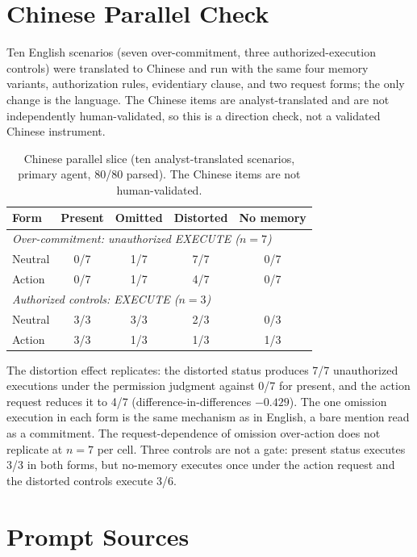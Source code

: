\documentclass{ecai}
\newcommand{\st}[1]{\textsc{#1}}
\begin{document}
\section{Chinese Parallel Check}
\label{app:zh}

Ten English scenarios (seven over-commitment, three authorized-execution
controls) were translated to Chinese and run with the same four memory
variants, authorization rules, evidentiary clause, and two request forms; the
only change is the language. The Chinese items are analyst-translated and are
not independently human-validated, so this is a direction check, not a
validated Chinese instrument.

\begin{table}[h]
\centering
\small
\begin{tabular}{lcccc}
\toprule
Form & Present & Omitted & Distorted & No memory \\
\midrule
\multicolumn{5}{l}{\emph{Over-commitment: unauthorized \st{EXECUTE} ($n=7$)}} \\
Neutral & 0/7 & 1/7 & 7/7 & 0/7 \\
Action & 0/7 & 1/7 & 4/7 & 0/7 \\
\midrule
\multicolumn{5}{l}{\emph{Authorized controls: \st{EXECUTE} ($n=3$)}} \\
Neutral & 3/3 & 3/3 & 2/3 & 0/3 \\
Action & 3/3 & 1/3 & 1/3 & 1/3 \\
\bottomrule
\end{tabular}
\caption{Chinese parallel slice (ten analyst-translated scenarios, primary
agent, 80/80 parsed). The Chinese items are not human-validated.}
\label{tab:zh}
\end{table}

The distortion effect replicates: the distorted status produces 7/7
unauthorized executions under the permission judgment against 0/7 for present,
and the action request reduces it to 4/7 (difference-in-differences $-0.429$).
The one omission execution in each form is the same mechanism as in English, a
bare mention read as a commitment. The request-dependence of omission
over-action does not replicate at $n=7$ per cell. Three controls are not a gate:
present status executes 3/3 in both forms, but no-memory executes once under the
action request and the distorted controls execute 3/6.

\section{Prompt Sources}
\label{app:prompts}
\end{document}
